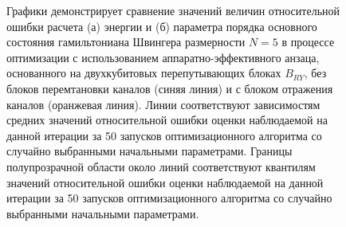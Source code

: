 \documentclass[14pt]{extarticle}
\begin{document}
\begin{figure}[H]
\begin{minipage}[H]{1.\linewidth}
\end{minipage}
\vfill
\begin{minipage}[H]{1.\linewidth}
\end{minipage}
\caption{Графики демонстрирует сравнение значений величин относительной ошибки расчета (а) энергии и (б) параметра порядка основного состояния гамильтониана Швингера размерности $N = 5$ в процессе оптимизации с использованием аппаратно-эффективного анзаца, основанного на двухкубитовых перепутывающих блоках $B_{RY}$, без блоков перемтановки каналов (синяя линия) и с блоком отражения каналов (оранжевая линия). Линии соответствуют зависимостям средних значений относительной ошибки оценки наблюдаемой на данной итерации за 50 запусков оптимизационного алгоритма со случайно выбранными начальными параметрами. Границы полупрозрачной области около линий соответствуют квантилям значений относительной ошибки оценки наблюдаемой на данной итерации за 50 запусков оптимизационного алгоритма со случайно выбранными начальными параметрами.}\label{fig:reflectance_comparence}
\end{figure}
\end{document}
